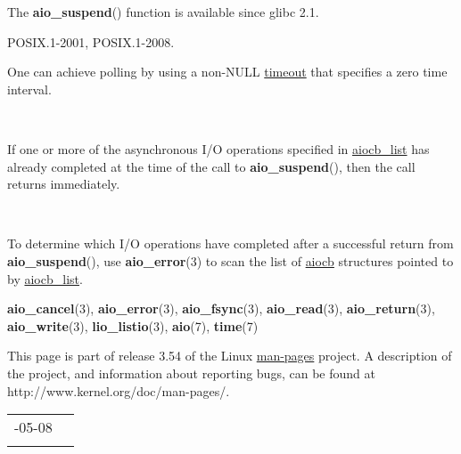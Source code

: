 \documentclass[]{article}
\let\realtextbf=\textbf
\renewcommand{\textbf}[1]{\textcolor{boldcolor}{\realtextbf{#1}}}
\renewcommand{\emph}[1]{\underline{#1}}
\begin{document}
The \textbf{aio\_suspend}() function is available since glibc 2.1.


POSIX.1-2001, POSIX.1-2008.


One can achieve polling by using a non-NULL \emph{timeout} that
specifies a zero time interval.

~

If one or more of the asynchronous I/O operations specified in
\emph{aiocb\_list} has already completed at the time of the call to
\textbf{aio\_suspend}(), then the call returns immediately.

~

To determine which I/O operations have completed after a successful
return from \textbf{aio\_suspend}(), use \textbf{aio\_error}(3) to scan
the list of \emph{aiocb} structures pointed to by \emph{aiocb\_list}.


\textbf{aio\_cancel}(3), \textbf{aio\_error}(3), \textbf{aio\_fsync}(3),
\textbf{aio\_read}(3), \textbf{aio\_return}(3), \textbf{aio\_write}(3),
\textbf{lio\_listio}(3), \textbf{aio}(7), \textbf{time}(7)


This page is part of release 3.54 of the Linux \emph{man-pages} project.
A description of the project, and information about reporting bugs, can
be found at http://www.kernel.org/doc/man-pages/.

\begin{longtable}[c]{@{}ll@{}}
\toprule\addlinespace
2012-05-08 &
\\\addlinespace
\bottomrule
\end{longtable}
\end{document}
